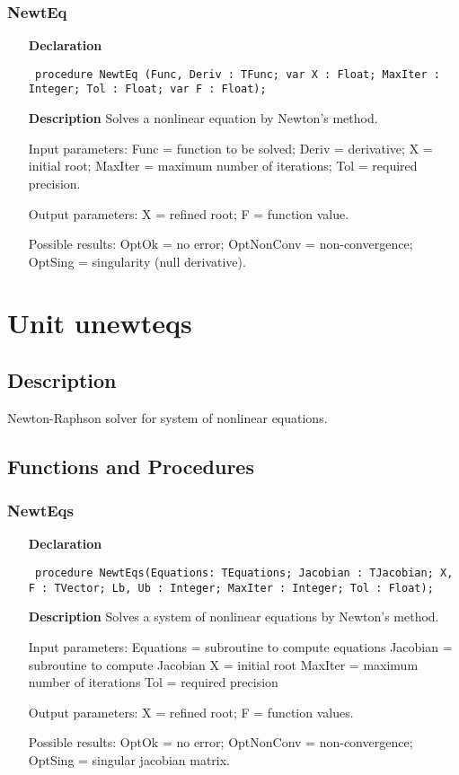 \documentclass[12pt,a4paper,oneside]{report}
\newcommand{\declarationitem}[1]{\textbf{#1}}
\newcommand{\descriptiontitle}[1]{\textbf{#1}}
\newcommand{\code}[1]{\texttt{#1}}
\begin{document}
\subsubsection{NewtEq}
\label{unewteq-NewtEq}
\begin{itemize}\item[\declarationitem{Declaration}\hfill]
	\begin{flushleft}
		\code{
			procedure NewtEq (Func, Deriv : TFunc; var X : Float; MaxIter : Integer; Tol : Float; var F : Float);}
	\end{flushleft}
	\item[\descriptiontitle{Description}]
	Solves a nonlinear equation by Newton's method.
	
	Input parameters: Func = function to be solved; Deriv = derivative; X = initial root; MaxIter = maximum number of iterations; Tol = required precision.
	
	Output parameters: X = refined root; F = function value.
	
	Possible results: OptOk = no error; OptNonConv = non{-}convergence; OptSing = singularity (null derivative).
\end{itemize}
\section{Unit unewteqs}
\label{unewteqs}
\subsection{Description}
Newton{-}Raphson solver for system of nonlinear equations. 
\subsection{Functions and Procedures}
\subsubsection{NewtEqs}
\label{unewteqs-NewtEqs}
\begin{itemize}\item[\declarationitem{Declaration}\hfill]
	\begin{flushleft}
		\code{
			procedure NewtEqs(Equations: TEquations; Jacobian : TJacobian; X, F : TVector; Lb, Ub : Integer; MaxIter : Integer; Tol : Float);}
	\end{flushleft}
	\item[\descriptiontitle{Description}]
	Solves a system of nonlinear equations by Newton's method.
	
	Input parameters: Equations = subroutine to compute equations Jacobian = subroutine to compute Jacobian X = initial root MaxIter = maximum number of iterations Tol = required precision
	
	Output parameters: X = refined root; F = function values.
	
	Possible results: OptOk = no error; OptNonConv = non{-}convergence; OptSing = singular jacobian matrix.
	
\end{itemize}
\end{document}
